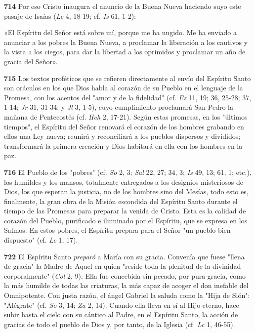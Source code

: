 \documentclass[]{article}
\begin{document}
\textbf{714} Por eso Cristo inaugura el anuncio de la Buena Nueva
haciendo suyo este pasaje de Isaías (\emph{Lc} 4, 18-19; cf. \emph{Is}
61, 1-2):

«El Espíritu del Señor está sobre mí, porque me ha ungido. Me ha enviado
a anunciar a los pobres la Buena Nueva, a proclamar la liberación a los
cautivos y la vista a los ciegos, para dar la libertad a los oprimidos y
proclamar un año de gracia del Señor».

\textbf{715} Los textos proféticos que se refieren directamente al envío
del Espíritu Santo son oráculos en los que Dios habla al corazón de su
Pueblo en el lenguaje de la Promesa, con los acentos del "amor y de la
fidelidad" (cf. \emph{Ez} 11, 19; 36, 25-28; 37, 1-14; \emph{Jr} 31,
31-34; y \emph{Jl} 3, 1-5), cuyo cumplimiento proclamará San Pedro la
mañana de Pentecostés (cf. \emph{Hch} 2, 17-21). Según estas promesas,
en los "últimos tiempos", el Espíritu del Señor renovará el corazón de
los hombres grabando en ellos una Ley nueva; reunirá y reconciliará a
los pueblos dispersos y divididos; transformará la primera creación y
Dios habitará en ella con los hombres en la paz.

\textbf{716} El Pueblo de los "pobres" (cf. \emph{So} 2, 3; \emph{Sal}
22, 27; 34, 3; \emph{Is} 49, 13; 61, 1; etc.), los humildes y los
mansos, totalmente entregados a los designios misteriosos de Dios, los
que esperan la justicia, no de los hombres sino del Mesías, todo esto
es, finalmente, la gran obra de la Misión escondida del Espíritu Santo
durante el tiempo de las Promesas para preparar la venida de Cristo.
Esta es la calidad de corazón del Pueblo, purificado e iluminado por el
Espíritu, que se expresa en los Salmos. En estos pobres, el Espíritu
prepara para el Señor "un pueblo bien dispuesto" (cf. \emph{Lc} 1, 17).

\textbf{722} El Espíritu Santo \emph{preparó} a María con su gracia.
Convenía que fuese "llena de gracia" la Madre de Aquel en quien "reside
toda la plenitud de la divinidad corporalmente" (\emph{Col} 2, 9). Ella
fue concebida sin pecado, por pura gracia, como la más humilde de todas
las criaturas, la más capaz de acoger el don inefable del Omnipotente.
Con justa razón, el ángel Gabriel la saluda como la "Hija de Sión":
"Alégrate" (cf. \emph{So} 3, 14; \emph{Za} 2, 14). Cuando ella lleva en
sí al Hijo eterno, hace subir hasta el cielo con su cántico al Padre, en
el Espíritu Santo, la acción de gracias de todo el pueblo de Dios y, por
tanto, de la Iglesia (cf. \emph{Lc} 1, 46-55).
\end{document}
